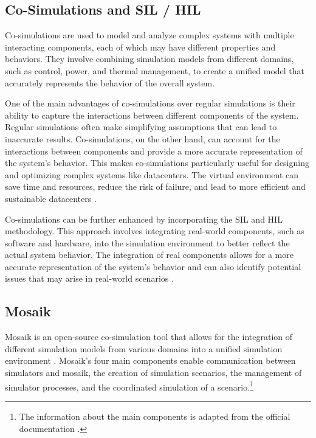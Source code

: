\subsection{Co-Simulations and SIL / HIL}

Co-simulations are used to model and analyze complex systems with multiple
interacting components, each of which may have different properties and
behaviors. They involve combining simulation models from different domains, such
as control, power, and thermal management, to create a unified model that
accurately represents the behavior of the overall system.

One of the main advantages of co-simulations over regular simulations is their
ability to capture the interactions between different components of the system.
Regular simulations often make simplifying assumptions that can lead to
inaccurate results. Co-simulations, on the other hand, can account for the
interactions between components and provide a more accurate representation of
the system's behavior. This makes co-simulations particularly useful for
designing and optimizing complex systems like datacenters. The virtual
environment can save time and resources, reduce the risk of failure, and lead to
more efficient and sustainable datacenters \cite{vogt2018}.

Co-simulations can be further enhanced by incorporating the SIL and HIL
methodology. This approach involves integrating real-world components, such as
software and hardware, into the simulation environment to better reflect the
actual system behavior. The integration of real components allows for a more
accurate representation of the system's behavior and can also identify potential
issues that may arise in real-world scenarios \cite{kelemenova2013}.

\subsection{Mosaik}

Mosaik is an open-source co-simulation tool that allows for the integration of
different simulation models from various domains into a unified simulation
environment \cite{steinbrink2019}. Mosaik’s four main components enable
communication between simulators and mosaik, the creation of simulation
scenarios, the management of simulator processes, and the coordinated simulation
of a scenario.\footnote{The information about the main components is adapted
from the official documentation \cite{mosaik_docs}.}

